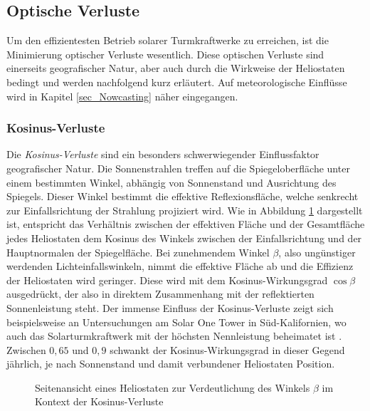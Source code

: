 \subsection{Optische Verluste} \label{subsec_OptischeVerluste}
Um den effizientesten Betrieb solarer Turmkraftwerke zu erreichen, ist die Minimierung optischer Verluste wesentlich.
Diese optischen Verluste sind einerseits geografischer Natur, aber auch durch die Wirkweise der Heliostaten bedingt und werden nachfolgend kurz erläutert.
Auf meteorologische Einflüsse wird in Kapitel \ref{sec_Nowcasting} näher eingegangen.

\subsubsection*{Kosinus-Verluste} \label{subsubsec_KosinusVerluste}
Die \textit{Kosinus-Verluste} sind ein besonders schwerwiegender Einflussfaktor geografischer Natur.
Die Sonnenstrahlen treffen auf die Spiegeloberfläche unter einem bestimmten Winkel, abhängig von Sonnenstand und Ausrichtung des Spiegels.
Dieser Winkel bestimmt die effektive Reflexionsfläche, welche senkrecht zur Einfallsrichtung der Strahlung projiziert wird.
Wie in Abbildung \ref{fig_KosinusVerlust} dargestellt ist, entspricht das Verhältnis zwischen der effektiven Fläche und der Gesamtfläche jedes Heliostaten dem Kosinus des Winkels zwischen der Einfallsrichtung und der Hauptnormalen der Spiegelfläche.
Bei zunehmendem Winkel $\beta$, also ungünstiger werdenden Lichteinfallswinkeln, nimmt die effektive Fläche ab und die Effizienz der Heliostaten wird geringer.
Diese wird mit dem Kosinus-Wirkungsgrad $\cos\beta$ ausgedrückt, der also in direktem Zusammenhang mit der reflektierten Sonnenleistung steht.
Der immense Einfluss der Kosinus-Verluste zeigt sich beispielsweise an Untersuchungen am Solar One Tower in Süd-Kalifornien, wo auch das Solarturmkraftwerk mit der höchsten Nennleistung beheimatet ist \cite{Ivanpah}.
Zwischen $0,65$ und $0,9$ schwankt der Kosinus-Wirkungsgrad in dieser Gegend jährlich, je nach Sonnenstand und damit verbundener Heliostaten Position. \cite{Holl}

\begin{figure}[h!]
    \centering
    \setlength{\fboxsep}{1pt}
    \setlength{\fboxrule}{1pt}
\caption[Seitenansicht eines Heliostaten zur Verdeutlichung des Winkels $\beta$ im Kontext der Kosinus-Verluste]{Seitenansicht eines Heliostaten zur Verdeutlichung des Winkels $\beta$ im Kontext der Kosinus-Verluste \cite[S.7]{DissZanger}}
    \label{fig_KosinusVerlust}
\end{figure}

